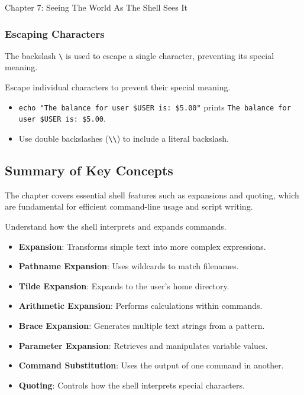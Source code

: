 \begin{notes}{Chapter 7: Seeing The World As The Shell Sees It}
\begin{highlight}[Quoting]
    \end{highlight}
    
    \subsubsection*{Escaping Characters}
    
    The backslash \texttt{\textbackslash} is used to escape a single character, preventing its special meaning.
    
    \begin{highlight}
    
    Escape individual characters to prevent their special meaning.
    
    \begin{itemize}
        \item \texttt{echo "The balance for user \$USER is: \$5.00"} prints \texttt{The balance for user \$USER is: \$5.00}.
        \item Use double backslashes (\texttt{\textbackslash{}\textbackslash{}}) to include a literal backslash.
    \end{itemize}
    
    \end{highlight}
    
    \subsection*{Summary of Key Concepts}
    
    The chapter covers essential shell features such as expansions and quoting, which are fundamental for efficient command-line usage and script writing.
    
    \begin{highlight}
    
    Understand how the shell interprets and expands commands.
    
    \begin{itemize}
        \item \textbf{Expansion}: Transforms simple text into more complex expressions.
        \item \textbf{Pathname Expansion}: Uses wildcards to match filenames.
        \item \textbf{Tilde Expansion}: Expands to the user's home directory.
        \item \textbf{Arithmetic Expansion}: Performs calculations within commands.
        \item \textbf{Brace Expansion}: Generates multiple text strings from a pattern.
        \item \textbf{Parameter Expansion}: Retrieves and manipulates variable values.
        \item \textbf{Command Substitution}: Uses the output of one command in another.
        \item \textbf{Quoting}: Controls how the shell interprets special characters.
    \end{itemize}
    

\end{highlight}
\end{notes}

